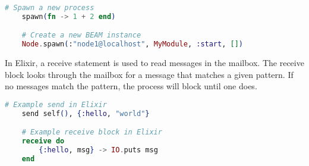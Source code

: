 \begin{lstlisting}[language=Elixir, xleftmargin=.2\linewidth, caption={An example of spawn/1 and spawn/4 in Elixir for spawning a new lightweight process and a new Elixir node}]
    # Spawn a new process
    spawn(fn -> 1 + 2 end)

    # Create a new BEAM instance
    Node.spawn(:"node1@localhost", MyModule, :start, [])
\end{lstlisting}

In Elixir, a receive statement is used to read messages in the mailbox. The receive block looks through the mailbox for a message that matches a given pattern. If no messages match the pattern, the process will block until one does.
\begin{lstlisting}[language=Elixir, xleftmargin=.4\linewidth, caption={An example of spawn/1 and spawn/4 in Elixir for spawning a new lightweight process and a new Elixir node}]
    # Example send in Elixir
    send self(), {:hello, "world"}

    # Example receive block in Elixir
    receive do
        {:hello, msg} -> IO.puts msg
    end
\end{lstlisting}
